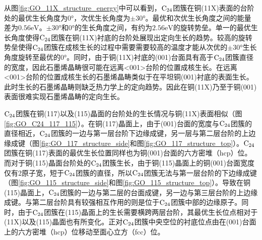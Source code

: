         从图\ref{fig:GO_11X_structure_energy}中可以看到，$\rm{C_{24}}$团簇在铜(11X)表面的台阶处的最优生长角度为$0\si{\degree}$，次优生长角度为$\pm 30\si{\degree}$。最优和次优生长角度之间的能量差为$0.56 \si{\electronvolt}$。$\pm 30 \si{\degree}$和$0\si{\degree}$的生长角度之间，有约为$2.56\si{\electronvolt}$的旋转势垒。单一的最优生长角度使得$\rm{C_{24}}$团簇在铜(11X)衬底的台阶处展现出定向生长的趋势。较高的旋转势垒使得$\rm{C_{24}}$团簇在成核生长的过程中需要需要较高的温度才能从次优的$\pm 30 \si{\degree}$生长角度旋转至最优的$0 \si{\degree}$。同时，由于铜(11X)衬底的(001)台面具有高于$\rm{C_{24}}$团簇直径的宽度，因此石墨烯晶畴很可能在远离<001>台阶的位置成核生长。在远离<001>台阶的位置成核生长的石墨烯晶畴类似于在平坦铜(001)衬底的表面生长。此时生长的石墨烯晶畴则缺乏热力学上的定向趋势。因此在铜(11X)乃至于铜(001)表面很难实现石墨烯晶畴的定向生长。

        $\rm{C_{24}}$团簇在铜(117)以及(115)晶面的台阶处的生长情况与铜(11X)表面相似（图\ref{fig:GO_C24_117_115}）。在铜(117)晶面上，由于(001)台面的宽度与$\rm{C_{24}}$团簇的直径相近，$\rm{C_{24}}$团簇的一边与第一层台阶下边缘成键，另一层与第二层台阶的上边缘成键（图\ref{fig:GO_117_structure_side}和图\ref{fig:GO_117_structure_top}）。$\rm{C_{24}}$团簇在铜(117)表面的最优生长位置同样也为铜(001)台面的六方密堆（hcp）位。而对于铜(115)晶面台阶处的$\rm{C_{24}}$团簇生长，由于铜(115)晶面上的铜(001)台面宽度仅有2原子宽，短于$\rm{C_{24}}$团簇的直径，所以$\rm{C_{24}}$团簇无法与第一层台阶的下边缘成键（图\ref{fig:GO_115_structure_side}和图\ref{fig:GO_115_structure_top}）。导致在铜(115)晶面上，$\rm{C_{24}}$团簇的一边与第二层的台面成键，另一边与第三层台阶的上边缘成键。与第二层台阶具有较强相互作用的则是位于$\rm{C_{24}}$团簇中部的边缘原子。同时，由于$\rm{C_{24}}$团簇在(115)晶面上的生长需要横跨两层台阶，其最优生长位点相对于(11X)以及(115)晶面也有所变化。正对$\rm{C_{24}}$团簇中央空位的衬底位点由在(001)台面上的六方密堆（hcp）位移动至面心立方（fcc）位。

